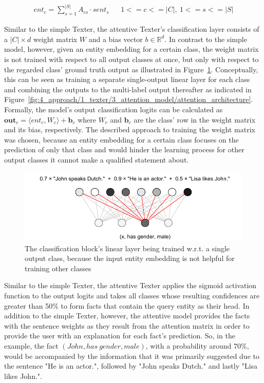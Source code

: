 \begin{align}
    ent_c = \sum_{s = 1}^{|S|} A_{cs} \cdot sent_s && 1 <= c <= |C|,~1 <= s <= |S|
    \label{eq:4_approach/1_texter/3_attention_model/ent_emb}
\end{align}

Similar to the simple Texter, the attentive Texter's classification layer consists of a $|C| \times d$ weight matrix $W$ and a bias vector $b \in \mathbb{R}^d$. In contrast to the simple model, however, given an entity embedding for a certain class, the weight matrix is not trained with respect to all output classes at once, but only with respect to the regarded class' ground truth output as illustrated in Figure~\ref{fig:4_approach/1_texter/3_attention_model/multi_linear}.  Conceptually, this can be seen as training a separate single-output linear layer for each class and combining the outputs to the multi-label output thereafter as indicated in Figure~\ref{fig:4_approach/1_texter/3_attention_model/attention_architecture}. Formally, the model's output classification logits can be calculated as $\textbf{out}_c = \langle ent_c, W_c \rangle + \textbf{b}_c$ where $W_c$ and $\textbf{b}_c$ are the class' row in the weight matrix and its bias, respectively. The described approach to training the weight matrix was chosen, because an entity embedding for a certain class focuses on the prediction of only that class and would hinder the learning process for other output classes it cannot make a qualified statement about.

\begin{figure}[t]
    \centering
    \includegraphics{4_approach/1_texter/3_attention_model/multi_linear}
    \caption{The classification block's linear layer being trained w.r.t. a single output class, because the input entity embedding is not helpful for training other classes}
    \label{fig:4_approach/1_texter/3_attention_model/multi_linear}
\end{figure}

Similar to the simple Texter, the attentive Texter applies the sigmoid activation function to the output logits and takes all classes whose resulting confidences are greater than 50\% to form facts that contain the query entity as their head. In addition to the simple Texter, however, the attentive model provides the facts with the sentence weights as they result from the attention matrix in order to provide the user with an explanation for each fact's prediction. So, in the example, the fact $(John, has~gender, male)$, with a probability around 70\%, would be accompanied by the information that it was primarily suggested due to the sentence "He is an actor.", followed by "John speaks Dutch." and lastly "Lisa likes John.".
